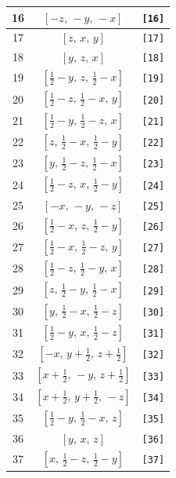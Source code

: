 \documentclass[fleqn,8pt]{jsarticle}
\begin{document}
\begin{longtable}{ccc}
16 & $\left[ - z,\, - y,\, - x \right]$ & {\tt [16]} \\ \hline
17 & $\left[ z,\, x,\, y \right]$ & {\tt [17]} \\ \hline
18 & $\left[ y,\, z,\, x \right]$ & {\tt [18]} \\ \hline
19 & $\left[ \frac{1}{2} - y,\, z,\, \frac{1}{2} - x \right]$ & {\tt [19]} \\ \hline
20 & $\left[ \frac{1}{2} - z,\, \frac{1}{2} - x,\, y \right]$ & {\tt [20]} \\ \hline
21 & $\left[ \frac{1}{2} - y,\, \frac{1}{2} - z,\, x \right]$ & {\tt [21]} \\ \hline
22 & $\left[ z,\, \frac{1}{2} - x,\, \frac{1}{2} - y \right]$ & {\tt [22]} \\ \hline
23 & $\left[ y,\, \frac{1}{2} - z,\, \frac{1}{2} - x \right]$ & {\tt [23]} \\ \hline
24 & $\left[ \frac{1}{2} - z,\, x,\, \frac{1}{2} - y \right]$ & {\tt [24]} \\ \hline
25 & $\left[ - x,\, - y,\, - z \right]$ & {\tt [25]} \\ \hline
26 & $\left[ \frac{1}{2} - x,\, z,\, \frac{1}{2} - y \right]$ & {\tt [26]} \\ \hline
27 & $\left[ \frac{1}{2} - x,\, \frac{1}{2} - z,\, y \right]$ & {\tt [27]} \\ \hline
28 & $\left[ \frac{1}{2} - z,\, \frac{1}{2} - y,\, x \right]$ & {\tt [28]} \\ \hline
29 & $\left[ z,\, \frac{1}{2} - y,\, \frac{1}{2} - x \right]$ & {\tt [29]} \\ \hline
30 & $\left[ y,\, \frac{1}{2} - x,\, \frac{1}{2} - z \right]$ & {\tt [30]} \\ \hline
31 & $\left[ \frac{1}{2} - y,\, x,\, \frac{1}{2} - z \right]$ & {\tt [31]} \\ \hline
32 & $\left[ - x,\, y + \frac{1}{2},\, z + \frac{1}{2} \right]$ & {\tt [32]} \\ \hline
33 & $\left[ x + \frac{1}{2},\, - y,\, z + \frac{1}{2} \right]$ & {\tt [33]} \\ \hline
34 & $\left[ x + \frac{1}{2},\, y + \frac{1}{2},\, - z \right]$ & {\tt [34]} \\ \hline
35 & $\left[ \frac{1}{2} - y,\, \frac{1}{2} - x,\, z \right]$ & {\tt [35]} \\ \hline
36 & $\left[ y,\, x,\, z \right]$ & {\tt [36]} \\ \hline
37 & $\left[ x,\, \frac{1}{2} - z,\, \frac{1}{2} - y \right]$ & {\tt [37]} \\ \hline

\end{longtable}
\end{document}
